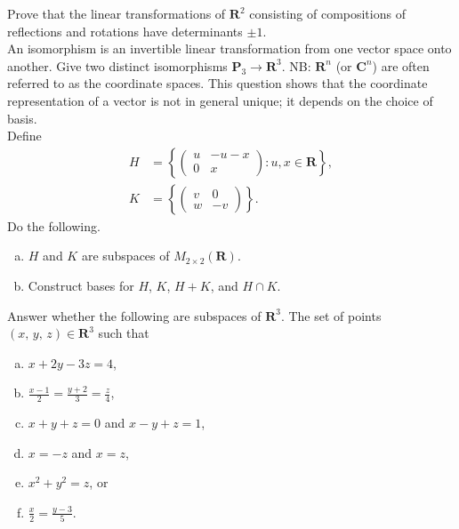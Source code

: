 \documentclass[a4paper,11pt]{article}
\newcommand{\R}{\mathbf{R}}
\newcommand{\C}{\mathbf{C}}
\newcommand{\PP}{\mathbf{P}}
\begin{document}
 Prove that the linear transformations of $\R^2$
consisting of compositions of reflections and rotations have determinants $\pm
1$. \\

 An isomorphism is an invertible linear
transformation from one vector space onto another. Give two distinct
isomorphisms $\PP_3 \rightarrow \R^3$. NB: $\R^n$ (or $\C^n$) are often referred
to as the coordinate spaces. This question shows that the coordinate
representation of a vector is not in general unique; it depends on the choice of
basis. \\

 Define
\begin{align*}
  H &=
      \left\{
      \begin{pmatrix}
        u & -u-x \\ 0 & x
      \end{pmatrix}
                        : u,x \in \R
                        \right\}, \\
  K &=
      \left\{
      \begin{pmatrix}
        v & 0 \\ w & -v
      \end{pmatrix}
                     \right\}.
\end{align*}
Do the following.
\begin{enumerate}[(a)]
\item $H$ and $K$ are subspaces of $M_{2 \times 2}(\R)$.
\item Construct bases for $H$, $K$, $H+K$, and $H \cap K$. \\
\end{enumerate}

 Answer whether the following are subspaces of
$\R^3$. The set of points $(x,\,y,\,z) \in \R^3$ such that
\begin{enumerate}[(a)]
\item $x+2y-3z=4$,
\item $\frac{x-1}{2}=\frac{y+2}{3}=\frac{z}{4}$,
\item $x+y+z=0$ and $x-y+z=1$,
\item $x=-z$ and $x=z$,
\item $x^2+y^2=z$, or
\item $\frac{x}{2} = \frac{y-3}{5}$.
\end{enumerate}
\end{document}
